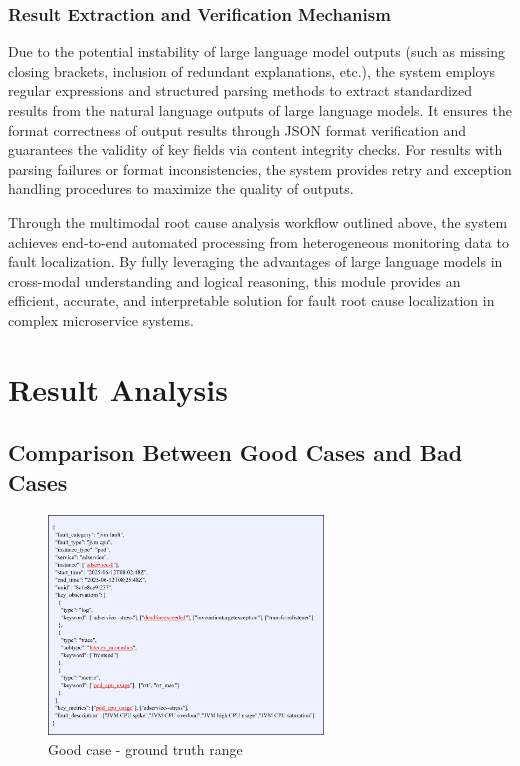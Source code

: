 \documentclass[10pt]{article}
\begin{document}
\subsubsection{Result Extraction and Verification Mechanism}

Due to the potential instability of large language model outputs (such as missing closing brackets, inclusion of redundant explanations, etc.), the system employs regular expressions and structured parsing methods to extract standardized results from the natural language outputs of large language models. It ensures the format correctness of output results through JSON format verification and guarantees the validity of key fields via content integrity checks. For results with parsing failures or format inconsistencies, the system provides retry and exception handling procedures to maximize the quality of outputs.

Through the multimodal root cause analysis workflow outlined above, the system achieves end-to-end automated processing from heterogeneous monitoring data to fault localization. By fully leveraging the advantages of large language models in cross-modal understanding and logical reasoning, this module provides an efficient, accurate, and interpretable solution for fault root cause localization in complex microservice systems.


\section{Result Analysis}

\subsection{Comparison Between Good Cases and Bad Cases}

\begin{figure}[!t]
    \centering
    \includegraphics[width=0.65\textwidth]{pics/fig19.png}
    \caption{Good case - ground truth range}
    \label{fig19}
\end{figure}
\end{document}
